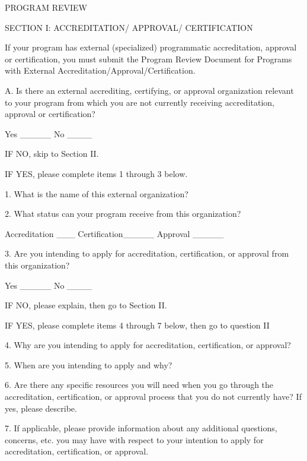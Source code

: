 PROGRAM REVIEW

SECTION I: ACCREDITATION/ APPROVAL/ CERTIFICATION

If your program has external (specialized) programmatic accreditation, approval or certification, you must submit the Program Review Document for Programs with External Accreditation/Approval/Certification.

A. Is there an external accrediting, certifying, or approval organization relevant to your program from which you are not currently receiving accreditation, approval or certification?

Yes _____		 No ____

IF NO, skip to Section II.

IF YES, please complete items 1 through 3 below.

1. What is the name of this external organization?


2. What status can your program receive from this organization?

Accreditation ___	 Certification_____ 	   Approval _____

3. Are you intending to apply for accreditation, certification, or approval from this organization?

Yes _____ 		No ____

IF NO, please explain, then go to Section II.

IF YES, please complete items 4 through 7 below, then go to question II

4. Why are you intending to apply for accreditation, certification, or approval?



5. When are you intending to apply and why?



6. Are there any specific resources you will need when you go through the accreditation, certification, or approval process that you do not currently have? If yes, please describe.



7. If applicable, please provide information about any additional questions, concerns, etc. you may have with respect to your intention to apply for accreditation, certification, or approval.































